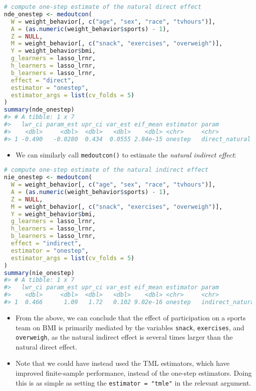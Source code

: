 \documentclass[
  12pt,
]{book}
\newcommand{\passthrough}[1]{#1}
\providecommand{\tightlist}{%
  \setlength{\itemsep}{0pt}\setlength{\parskip}{0pt}}
\theoremstyle{definition}
\theoremstyle{definition}
\theoremstyle{definition}
\newcommand{\1}{\mathbbm{1}}
\begin{document}
\begin{lstlisting}[language=R]
# compute one-step estimate of the natural direct effect
nde_onestep <- medoutcon(
  W = weight_behavior[, c("age", "sex", "race", "tvhours")],
  A = (as.numeric(weight_behavior$sports) - 1),
  Z = NULL,
  M = weight_behavior[, c("snack", "exercises", "overweigh")],
  Y = weight_behavior$bmi,
  g_learners = lasso_lrnr,
  h_learners = lasso_lrnr,
  b_learners = lasso_lrnr,
  effect = "direct",
  estimator = "onestep",
  estimator_args = list(cv_folds = 5)
)
summary(nde_onestep)
#> # A tibble: 1 x 7
#>   lwr_ci param_est upr_ci var_est eif_mean estimator param         
#>    <dbl>     <dbl>  <dbl>   <dbl>    <dbl> <chr>     <chr>         
#> 1 -0.490   -0.0280  0.434  0.0555 2.84e-15 onestep   direct_natural
\end{lstlisting}

\begin{itemize}
\tightlist
\item
  We can similarly call \passthrough{\lstinline!medoutcon()!} to estimate the \emph{natural indirect effect}:
\end{itemize}

\begin{lstlisting}[language=R]
# compute one-step estimate of the natural indirect effect
nie_onestep <- medoutcon(
  W = weight_behavior[, c("age", "sex", "race", "tvhours")],
  A = (as.numeric(weight_behavior$sports) - 1),
  Z = NULL,
  M = weight_behavior[, c("snack", "exercises", "overweigh")],
  Y = weight_behavior$bmi,
  g_learners = lasso_lrnr,
  h_learners = lasso_lrnr,
  b_learners = lasso_lrnr,
  effect = "indirect",
  estimator = "onestep",
  estimator_args = list(cv_folds = 5)
)
summary(nie_onestep)
#> # A tibble: 1 x 7
#>   lwr_ci param_est upr_ci var_est eif_mean estimator param           
#>    <dbl>     <dbl>  <dbl>   <dbl>    <dbl> <chr>     <chr>           
#> 1  0.466      1.09   1.72   0.102 9.02e-16 onestep   indirect_natural
\end{lstlisting}

\begin{itemize}
\tightlist
\item
  From the above, we can conclude that the effect of participation on a sports
  team on BMI is primarily mediated by the variables \passthrough{\lstinline!snack!}, \passthrough{\lstinline!exercises!}, and
  \passthrough{\lstinline!overweigh!}, as the natural indirect effect is several times larger than the
  natural direct effect.
\item
  Note that we could have instead used the TML estimators, which have improved
  finite-sample performance, instead of the one-step estimators. Doing this is
  as simple as setting the \passthrough{\lstinline!estimator = "tmle"!} in the relevant argument.
\end{itemize}
\end{document}

